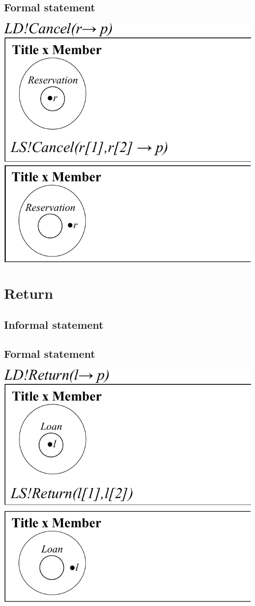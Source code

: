 \documentclass[]{report}
\begin{document}
\subsection{Formal statement}
\begin{center}
	\includegraphics[scale=0.75]{cancel.pdf}
\end{center}
\newpage
\section{Return}
\subsection{Informal statement}
\subsection{Formal statement}
\begin{center}
	\includegraphics[scale=0.75]{return.pdf}
\end{center}
\newpage
\end{document}
